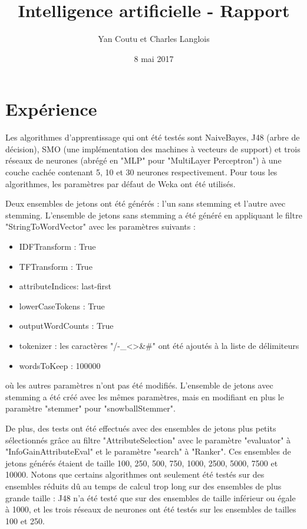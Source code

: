 \documentclass[11pt]{article} %
\title{Intelligence artificielle - Rapport}
\author{Yan Coutu et Charles Langlois}
\date{8 mai 2017}
\begin{document}
\maketitle

\section{Expérience}

Les algorithmes d'apprentissage qui ont été testés sont NaiveBayes, J48 (arbre de décision), SMO (une implémentation des machines à vecteurs de support) et trois réseaux de neurones (abrégé en "MLP" pour "MultiLayer Perceptron") à une couche cachée contenant 5, 10 et 30 neurones respectivement. Pour tous les algorithmes, les paramètres par défaut de Weka ont été utilisés.

Deux ensembles de jetons ont été générés : l'un sans stemming et l'autre avec stemming. L'ensemble de jetons sans stemming a été généré en appliquant le filtre "StringToWordVector" avec les paramètres suivants :

\begin{itemize}
\item IDFTransform : True
\item TFTransform : True
\item attributeIndices: last-first
\item lowerCaseTokens : True
\item outputWordCounts : True
\item tokenizer : les caractères "/-\_\textless\textgreater\&\#" ont été ajoutés à la liste de délimiteurs
\item wordsToKeep : 100000
\end{itemize}

où les autres paramètres n'ont pas été modifiés. L'ensemble de jetons avec stemming a été créé avec les mêmes paramètres, mais en modifiant en plus le paramètre "stemmer" pour "snowballStemmer".

De plus, des tests ont été effectués avec des ensembles de jetons plus petits sélectionnés grâce au filtre "AttributeSelection" avec le paramètre "evaluator" à "InfoGainAttributeEval" et le paramètre "search" à "Ranker". Ces ensembles de jetons générés étaient de taille 100, 250, 500, 750, 1000, 2500, 5000, 7500 et 10000. Notons que certains algorithmes ont seulement été testés sur des ensembles réduits dû au temps de calcul trop long sur des ensembles de plus grande taille :  J48 n'a été testé que sur des ensembles de taille inférieur ou égale à 1000, et les trois réseaux de neurones ont été testés sur les ensembles de tailles 100 et 250.
\end{document}
